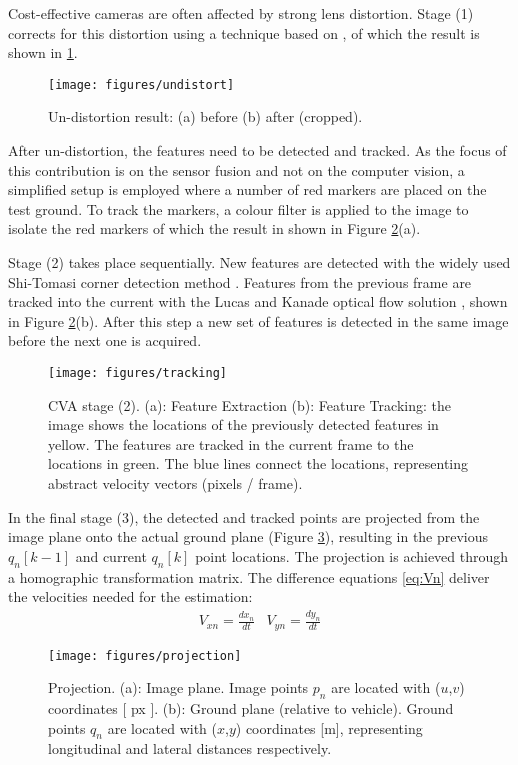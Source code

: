 \documentclass[letterpaper, 10 pt, conference]{ieeeconf}
\begin{document}
Cost-effective cameras are often affected by strong lens distortion. Stage (1) corrects for this distortion using a technique  based on \cite{a-flexible-new-technique-for-camera-calibration}, of which the result is shown in \cref{fig:undistort}.
\begin{figure}[h]
\centering
{}
{\texttt{[image: figures/undistort]}}
\caption{Un-distortion result: (a) before (b) after (cropped).}
\label{fig:undistort}
\end{figure}
After un-distortion, the features need to be detected and tracked. As the focus of this contribution is on the sensor fusion and not on the computer vision, a simplified setup is employed where a number of red markers are placed on the test ground.  To track the markers, a colour filter is applied to the image to isolate the red markers of which the result in shown in Figure \ref{fig:tracking}(a). 

Stage (2) takes place sequentially. New features are detected with the widely used Shi-Tomasi corner detection method \cite{tomasi1993direction}. Features from the previous frame are tracked into the current with the Lucas and Kanade optical flow solution \cite{lucas1981iterative}, shown in Figure \ref{fig:tracking}(b). After this step a new set of features is detected in the same image before the next one is acquired.
\begin{figure}[h]
\centering
{}
{\texttt{[image: figures/tracking]}}
\caption{CVA stage (2). (a): Feature Extraction  (b): Feature Tracking: the image shows the locations of the previously detected features in yellow. The features are tracked in the current frame to the locations in green. The blue lines connect the locations, representing abstract velocity vectors (pixels / frame).}
\label{fig:tracking}
\end{figure}

In the final stage (3), the detected and tracked points are projected from the image plane onto the actual ground plane (Figure \ref{fig:projection}), resulting in the previous $q_n[k-1]$ and current $q_n[k]$ point locations. The projection is achieved through a homographic transformation matrix. The difference equations \eqref{eq:Vn} deliver the velocities needed for the estimation:
\begin{equation}\label{eq:Vn}
\begin{array}{*{20}{c}}
  {{V_{xn}} = \frac{{d{x_n}}}{{dt}}}&{{V_{yn}} = \frac{{d{y_n}}}{{dt}}} 
\end{array}
\end{equation} 
\begin{figure}[h]
\centering
{}
{\texttt{[image: figures/projection]}}
\caption{Projection. (a): Image plane. Image points $p_n$ are located with ($u$,$v$) coordinates [ px ]. (b): Ground plane (relative to vehicle). Ground points $q_n$ are located with ($x$,$y$) coordinates [m], representing longitudinal and lateral distances respectively.}
\label{fig:projection}
\end{figure}
\end{document}
